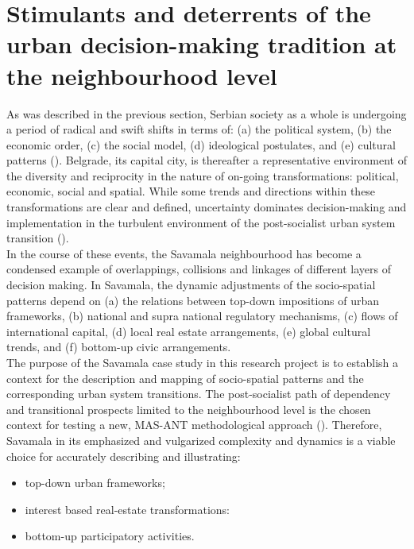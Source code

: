\documentclass[11pt]{report}
\begin{document}
\section{Stimulants and deterrents of the urban decision-making tradition at the neighbourhood level}

As was described in the previous section, Serbian society as a whole is undergoing a period of radical and swift shifts in terms of:  (a) the political system, (b) the economic order,
(c)	the social model, (d) ideological postulates, and (e) cultural patterns  (\href{Petrovic}{\citealt{petrovic_cities_2009}}).
Belgrade, its capital city, is thereafter a representative environment of the diversity and reciprocity in the nature of on-going transformations: political, economic, social and spatial. While some trends and directions within these transformations are clear and defined, uncertainty dominates decision-making and implementation in the turbulent environment of the post-socialist urban system transition (\href{Nedovic}{\citealt{nedovic-budic_adjustment_2001}}).
\\

In the course of these events, the Savamala neighbourhood has become a condensed example of overlappings, collisions and linkages of different layers of decision making.
In Savamala, the dynamic adjustments of the socio-spatial patterns depend on
(a) the relations between top-down impositions of urban frameworks, (b) national and supra national regulatory mechanisms,
(c) flows of international capital,
(d) local real estate arrangements,
(e) global cultural trends, and
(f) bottom-up civic arrangements.
\\

The purpose of the Savamala case study in this research project is to establish a context for the description and mapping of socio-spatial patterns and the corresponding urban system transitions. The post-socialist path of dependency and transitional prospects limited to the neighbourhood level is the chosen context for testing a new, MAS-ANT methodological approach (\href{Yin}{\citealt{yin_case_2009}}).
Therefore, Savamala in its emphasized and vulgarized complexity and dynamics is a viable choice for accurately describing and illustrating:
\begin{itemize}
\item top-down urban frameworks;
\item interest based real-estate transformations:
\item bottom-up participatory activities.
\end{itemize}
\end{document}
